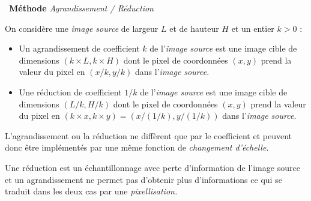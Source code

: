 \documentclass[a4paper, french, 12pt]{article}
\newenvironment{methode}[1]
{\par \medskip    \noindent  
 \begin {bclogo}[arrondi =0.1,logo=\bcoutil, marge=4,noborder = true] {~\textbf{Méthode}   {\itshape #1} }  \par}
{
\end{bclogo}
 \par \bigskip }
\begin{document}
\begin{methode}{Agrandissement / Réduction}

On considère une \textit{image source} de largeur $L$ et de hauteur $H$ et un entier $k>0$ :

\begin{itemize}[label=]
	\item Un agrandissement de coefficient $k$ de l'\textit{image source} est une image cible de dimensions $(k\times L, k \times H)$ dont le pixel de coordonnées $(x,y)$ prend la valeur du pixel en $(x/k,y/k)$ dans l'\textit{image source}.
	\item Une réduction de coefficient $1/k$ de l'\textit{image source} est une image cible de dimensions $(L/k,H/k)$ dont le pixel de coordonnées $(x,y)$ prend la valeur du pixel en $(k \times x,k \times y)=(x/(1/k),y/(1/k))$ dans l'\textit{image source}.
\end{itemize}

L'agrandissement ou la réduction ne diffèrent que par le coefficient et peuvent donc être implémentés par une même fonction de \textit{changement d'échelle}.

\bcattention{} Une réduction est un échantillonnage avec perte d'information de l'image source  et un agrandissement ne permet pas d'obtenir plus d'informations ce qui se traduit dans les deux cas par une \textit{pixellisation.}

\begin{center}
\end{center}
\end{methode}


\vspace*{-15pt}
\end{document}
